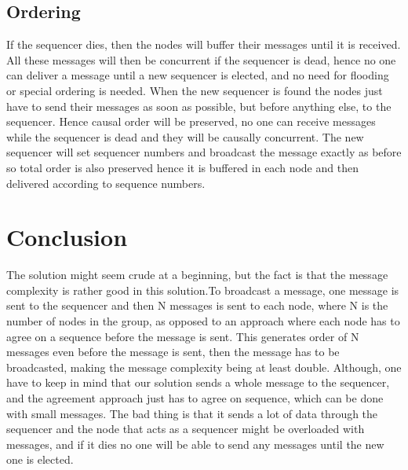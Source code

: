 \documentclass{article}
\begin{document}
  \subsection{Ordering}
    If the sequencer dies, then the nodes will buffer their messages until it is received. 
    All these messages will then be concurrent if the sequencer is dead, hence no one can 
    deliver a message until a new sequencer is elected, and no need for flooding or special
    ordering is needed. When the new sequencer is found the nodes just have to send their messages as soon
    as possible, but before anything else, to the sequencer. Hence causal order will be preserved, no one
    can receive messages while the sequencer is dead and they will be causally concurrent. The new sequencer
    will set sequencer numbers and broadcast the message exactly as before so total order is also preserved
    hence it is buffered in each node and then delivered according to sequence numbers.
    
\section{Conclusion}
  The solution might seem crude at a beginning, but the fact is that the message complexity
  is rather good in this solution.To broadcast a message, one message is sent to the sequencer and then N 
  messages is sent to each node, where N is the number of nodes in the group, as opposed to an approach
  where each node has to agree on a sequence before the message is sent. This generates order of N messages
  even before the message is sent, then the message has to be broadcasted, making the message complexity
  being at least double. Although, one have to keep in mind that our solution sends a whole message
  to the sequencer, and the agreement approach just has to agree on sequence, which can be done with
  small messages. The bad thing is that it sends a lot of data through the sequencer and the node 
  that acts as a sequencer might be overloaded with messages, and if it dies no one will be able 
  to send any messages until the new one is elected.
\end{document}
